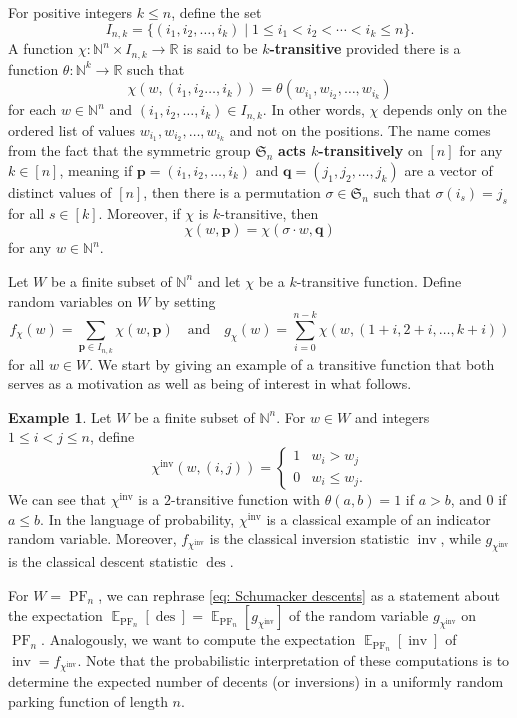 \documentclass{amsart}
\newcommand{\N}{\mathbb{N}}
\newcommand{\R}{\mathbb{R}}
\renewcommand{\S}{\mathfrak{S}}
\DeclareMathOperator{\des}{des}
\DeclareMathOperator{\inv}{inv}
\DeclareMathOperator{\PF}{PF}
\newcommand{\defterm}{\textbf}
\DeclareMathOperator{\E}{\mathbb{E}}
\theoremstyle{definition}
\newtheorem{example}[theorem]{Example}
\begin{document}
For positive integers $k\leq n$, define the set \[I_{n,k}=\{(i_1,i_2,\dots,i_k)\mid 1\leq i_1<i_2<\cdots<i_k\leq n\}.\] A function $\chi:\N^n\times I_{n,k}\to \R $ is said to be \defterm{$k$-transitive} provided there is a function $\theta:\N^k\to \R$ such that 
\begin{equation}
    \chi(w,(i_1,i_2\dots,i_k))=\theta (w_{i_1},w_{i_2},\dots,w_{i_k})
\end{equation}
for each $w\in \N^n$ and $(i_1,i_2,\dots,i_k)\in I_{n,k}$. In other words, $\chi$ depends only on the ordered list of values $w_{i_1},w_{i_2},\dots,w_{i_k}$ and not on the positions. The name comes from the fact that the symmetric group $\S_n$ \textbf{acts $k$-transitively} on $[n]$ for any $k\in [n]$, meaning if $\textbf{p}=(i_1,i_2,\dots,i_k)$ and $\textbf{q}=(j_1,j_2,\dots,j_k)$ are a vector of distinct values of $[n]$, then there is a permutation $\sigma\in \S_n$ such that $\sigma(i_s)=j_s$ for all $s\in [k]$. Moreover, if $\chi$ is $k$-transitive, then 
\begin{equation}\label{eq:k-transitive-invariance-of-stat}\chi(w, \textbf{p})=\chi(\sigma\cdot w,\textbf{q})\end{equation} 
for any $w\in \N^n$.

Let $W$ be a finite subset of $\N^n$ and let $\chi$ be a $k$-transitive function. Define random variables on $W$ by setting 
\begin{equation}\label{eq:f_and_g_sub_chi}
f_\chi(w)=\sum_{\textbf{p}\in I_{n,k}}\chi(w,\textbf{p})\quad \text{and}\quad g_\chi(w)=\sum_{i=0}^{n-k}\chi(w,(1+i,2+i,\dots,k+i))
\end{equation}
for all $w\in W$. 
We start by giving an example of a transitive function that both serves as a motivation as well as being of interest in what follows.
\begin{example}
Let $W$ be a finite subset of $\N^n$. For $w\in W$ and integers $1\leq i<j\leq n$, define
\[\chi^{\inv}(w,(i,j))=\begin{cases}
    1& w_i>w_j\\
    0&w_i\leq w_j.
\end{cases}\]
We can see that $\chi^{\inv}$ is a $2$-transitive function with $\theta(a,b)=1$ if $a>b$,  and $0$ if $a\leq b$. 
In the language of probability, $\chi^{\inv}$ is a classical example of an indicator random variable. 
Moreover, $f_{\chi^{\inv}}$ is the classical inversion statistic $\inv$, while $g_{\chi^{\inv}}$ is the classical descent statistic $\des$. 

For $W=\PF_n$, we can rephrase \eqref{eq: Schumacker descents} as a statement about the expectation $\E_{\PF_n}\left[\des\right] =\E_{\PF_n}\left[g_{\chi^{\inv}}\right]$  of the random variable $g_{\chi^{\inv}}$ on $\PF_n$. 
Analogously,  we want to compute the expectation $\E_{\PF_n}\left[\inv\right]$ of $\inv=f_{\chi^{\inv}}$. 
Note that the probabilistic interpretation of these computations is to determine the expected number of decents (or inversions) in a uniformly random parking function of length $n$.
\end{example}
\end{document}
